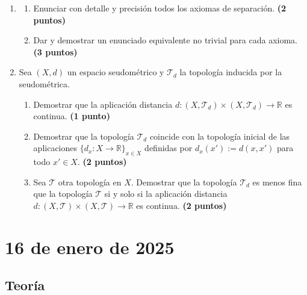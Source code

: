 \begin{enumerate}
    \item 
    \begin{enumerate}
        \item Enunciar con detalle y precisión todos los axiomas de separación.
        \hfill \textbf{(2 puntos)}
        \item Dar y demostrar un enunciado equivalente no trivial para cada axioma.
        \hfill \textbf{(3 puntos)}
    \end{enumerate}

    \item Sea $(X, d)$ un espacio seudométrico y $\mathcal{T}_d$ la topología inducida por la seudométrica.
    \begin{enumerate}
        \item Demostrar que la aplicación distancia $d : (X, \mathcal{T}_d) \times (X, \mathcal{T}_d) \to \mathbb{R}$ es continua.
        \hfill \textbf{(1 punto)}
        \item Demostrar que la topología $\mathcal{T}_d$ coincide con la topología inicial de las aplicaciones $\{d_x : X \to \mathbb{R}\}_{x \in X}$ definidas por $d_x(x') := d(x, x')$ para todo $x' \in X$.
        \hfill \textbf{(2 puntos)}
        \item Sea $\mathcal{T}$ otra topología en $X$. Demostrar que la topología $\mathcal{T}_d$ es menos fina que la topología $\mathcal{T}$ si y solo si la aplicación distancia $d : (X, \mathcal{T}) \times (X, \mathcal{T}) \to \mathbb{R}$ es continua.
        \hfill \textbf{(2 puntos)}
    \end{enumerate}
\end{enumerate}

\newpage

\section{16 de enero de 2025}

\subsection{Teoría}


